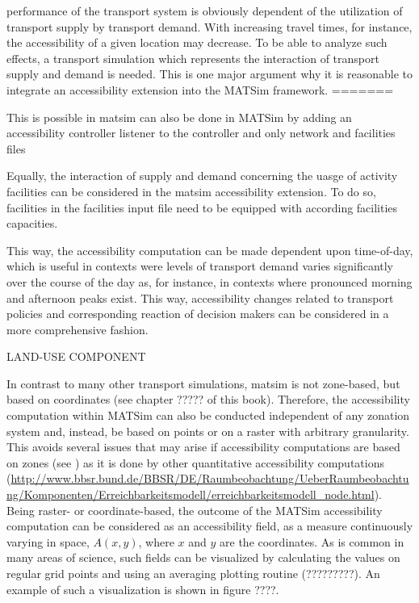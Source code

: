 performance of the transport system is obviously dependent of the utilization of transport supply by transport 
demand. With increasing travel times, for instance, the accessibility of a given location may decrease. To be able 
to analyze such effects, a transport simulation which represents the interaction of transport supply and demand is 
needed. This is one major argument why it is reasonable to integrate an accessibility extension into the MATSim framework.
=======


This is possible in \gls{matsim} can also be done in MATSim by adding an accessibility controller listener to the 
controller and only network and facilities files

Equally, the interaction of supply and demand concerning the uasge of activity facilities can be considered in 
the \gls{matsim} accessibility extension. To do so, facilities in the facilities input file need to be equipped 
with according facilities capacities.

This way, the accessibility computation can be made dependent upon time-of-day, which is useful in contexts were 
levels of transport demand varies significantly over the course of the day as, for instance, in contexts where 
pronounced morning and afternoon peaks exist. This way, accessibility changes related to transport policies and 
corresponding reaction of decision makers can be considered in a more comprehensive fashion.


LAND-USE COMPONENT

In contrast to many other transport simulations, \gls{matsim} is not zone-based, but based on coordinates (see 
chapter ????? of this book). Therefore, the accessibility computation within MATSim can also be conducted independent 
of any zonation system and, instead, be based on points or on a raster with arbitrary granularity. This avoids 
several issues that may arise if accessibility computations are based on zones 
(see \citep[e.g.,][]{NicolaiNagel2012HiResAccessibilityMethodInBook}) as it is done by other quantitative 
accessibility computations 
%
%
(\url{http://www.bbsr.bund.de/BBSR/DE/Raumbeobachtung/UeberRaumbeobachtung/Komponenten/Erreichbarkeitsmodell/erreichbarkeitsmodell_node.html}). Being raster- or coordinate-based, the outcome of the MATSim accessibility computation can be considered as 
an accessibility field,
\ie as a measure continuously varying in space, $A(x,y)$, where $x$ and $y$
are the coordinates. As is common in many areas of science, such
fields can be visualized by calculating the values on regular grid
points and using an averaging plotting routine (?????????). An example of such a visualization is shown in figure ????.


